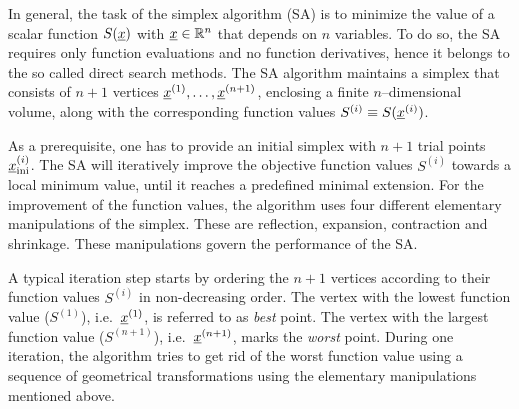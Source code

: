 In general, the task of the simplex algorithm (SA) is to minimize the value of a scalar 
function $S({\underline x })$ with ${\underline x }\in \mathbb{R}^{n}$ that depends on $n$ variables. 
To do so, the SA requires only function evaluations and no function derivatives, hence it 
belongs to the so called direct search methods. 
The SA algorithm maintains a simplex that consists of $n+1$ vertices ${\underline x }^{(1)},\ldots,{\underline x }^{(n+1)}$, 
enclosing a finite $n$--dimensional volume, along with the corresponding function values 
$S^{(i)}\equiv S({\underline x }^{(i)})$. 

As a prerequisite, one has to provide an initial simplex with $n+1$ trial points ${\underline x }_{{\rm ini}}^{(i)}$. 
The SA will iteratively improve the objective function values $S^{(i)}$ towards a local minimum value,
until it reaches a predefined minimal extension. 
For the improvement of the function values, the algorithm uses four different elementary 
manipulations of the simplex.
These are reflection, expansion, contraction and shrinkage. 
These manipulations govern the performance of the SA. 

A typical iteration step starts by ordering the $n+1$ vertices according to their function values $S^{(i)}$ 
in non-decreasing order. 
The vertex with the lowest function value ($S^{(1)}$), i.e.\ ${\underline x }^{(1)}$, is referred to as \emph{best} point. 
The vertex with the largest function value ($S^{(n+1)}$), i.e.\ ${\underline x }^{(n+1)}$, marks the \emph{worst} point. 
During one iteration, the algorithm tries to get rid of the worst function value using a sequence 
of geometrical transformations using the elementary manipulations mentioned above. 

